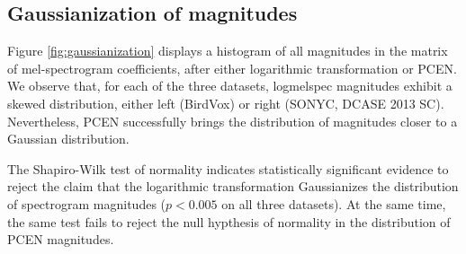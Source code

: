 \documentclass[journal]{IEEEtran}
\theoremstyle{remark}
\begin{document}
\subsection{Gaussianization of magnitudes}\label{sub:gaussianization}
Figure \ref{fig:gaussianization} displays a histogram of all magnitudes in the matrix of mel-spectrogram coefficients, after either logarithmic transformation or PCEN.
We observe that, for each of the three datasets, logmelspec magnitudes exhibit a skewed distribution, either left (BirdVox) or right (SONYC, DCASE 2013 SC).
Nevertheless, PCEN successfully brings the distribution of magnitudes closer to a Gaussian distribution.

The Shapiro-Wilk test of normality indicates statistically significant evidence to reject the claim that the logarithmic transformation Gaussianizes the distribution of spectrogram magnitudes ($p<0.005$ on all three datasets).
At the same time, the same test fails to reject the null hypthesis of normality in the distribution of PCEN magnitudes.
\end{document}
